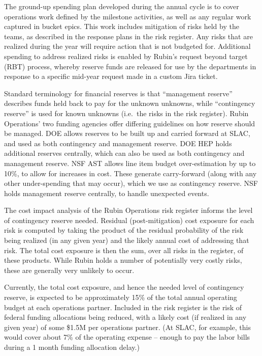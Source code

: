 The ground-up spending plan developed during the annual \gls{cycle} is to cover operations work defined by the milestone activities, as well as any regular work captured in bucket epics.
This work includes mitigation of risks held by the teams, as described in the response plans in the risk register.
Any risks that are realized during the year will require action that is not budgeted for.
Additional spending to address realized risks is enabled by Rubin's request beyond target (\gls{RBT}) process, whereby reserve funds are released for use by the departments in response to a specific mid-year request made in a custom Jira ticket.

Standard terminology for financial reserves is that ``management reserve'' describes funds held back to pay for the unknown unknowns, while ``contingency reserve'' is used for known unknowns (i.e.\ the risks in the risk register).
Rubin \gls{Operations}' two funding agencies offer differing guidelines on how reserve should be managed.
DOE allows reserves to be built up and carried forward at \gls{SLAC}, and used as both contingency and management reserve.
DOE \gls{HEP} holds additional reserves centrally, which can also be used as both contingency and management reserve.
NSF \gls{AST} allows line item budget over-estimation by up to 10\%, to allow for increases in cost.
These generate carry-forward (along with any other under-spending that may occur), which we use as contingency reserve.
NSF holds management reserve centrally, to handle unexpected events.

The cost impact analysis of the \gls{Rubin Operations} risk register informs the level of contingency reserve needed.
Residual (post-mitigation) cost exposure for each risk is computed by taking the  product of the residual probability of the risk being realized (in any given year) and the likely annual cost of addressing that risk.
The total cost exposure is then the sum, over all risks in the register, of these products.
While Rubin holds a number of potentially very costly risks, these are generally very unlikely to occur.

Currently, the total cost exposure, and hence the needed level of contingency reserve, is expected to be approximately 15\% of the total annual operating budget at each operations partner.
Included in the risk register is the risk of federal funding allocations being reduced, with a likely cost (if realized in any given year) of some \$1.5M per operations partner.
(At \gls{SLAC}, for example, this would cover about 7\% of the operating expense -- enough to pay the labor bills during a 1 month funding allocation delay.)

